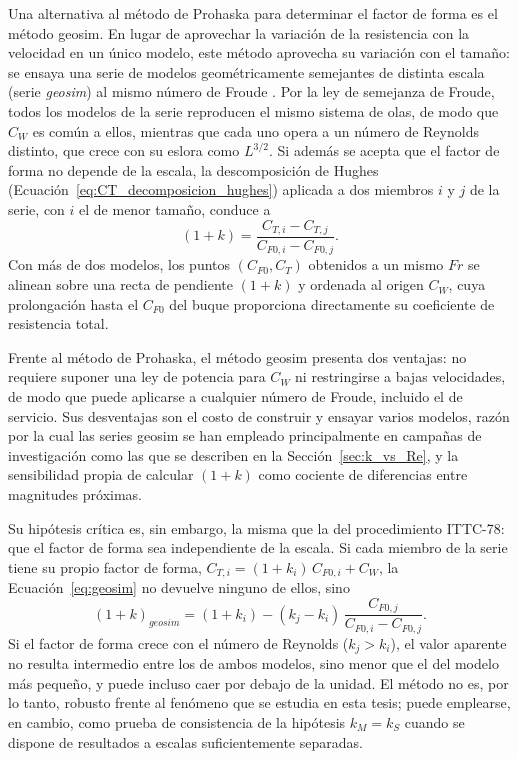 Una alternativa al método de Prohaska para determinar el factor de forma es el
método geosim. En lugar de aprovechar la variación de la resistencia con la
velocidad en un único modelo, este método aprovecha su variación con el tamaño:
se ensaya una serie de modelos geométricamente semejantes de distinta escala
(serie \emph{geosim}) al mismo número de Froude \citep{molland2017ship}. Por la
ley de semejanza de Froude, todos los modelos de la serie reproducen el mismo
sistema de olas, de modo que $C_W$ es común a ellos, mientras que cada uno opera a
un número de Reynolds distinto, que crece con su eslora como $L^{3/2}$. Si además
se acepta que el factor de forma no depende de la escala, la descomposición de
Hughes (Ecuación~\eqref{eq:CT_decomposicion_hughes}) aplicada a dos miembros
$i$ y $j$ de la serie, con $i$ el de menor tamaño, conduce a
%
\begin{equation}
    (1+k) = \frac{C_{T,i} - C_{T,j}}{C_{F0,i} - C_{F0,j}} .
    \label{eq:geosim}
\end{equation}
%
Con más de dos modelos, los puntos $(C_{F0}, C_T)$ obtenidos a un mismo $Fr$ se
alinean sobre una recta de pendiente $(1+k)$ y ordenada al origen $C_W$, cuya
prolongación hasta el $C_{F0}$ del buque proporciona directamente su coeficiente
de resistencia total.

Frente al método de Prohaska, el método geosim presenta dos ventajas: no
requiere suponer una ley de potencia para $C_W$ ni restringirse a bajas
velocidades, de modo que puede aplicarse a cualquier número de Froude, incluido
el de servicio. Sus desventajas son el costo de construir y ensayar varios
modelos, razón por la cual las series geosim se han empleado principalmente en
campañas de investigación como las que se describen en la
Sección~\ref{sec:k_vs_Re}, y la sensibilidad propia de calcular $(1+k)$ como
cociente de diferencias entre magnitudes próximas.

Su hipótesis crítica es, sin embargo, la misma que la del procedimiento ITTC-78:
que el factor de forma sea independiente de la escala. Si cada miembro de la
serie tiene su propio factor de forma, $C_{T,i} = (1+k_i)\,C_{F0,i} + C_W$, la
Ecuación~\eqref{eq:geosim} no devuelve ninguno de ellos, sino
%
\begin{equation}
    (1+k)_{geosim} = (1+k_i) - (k_j - k_i)\,
    \frac{C_{F0,j}}{C_{F0,i} - C_{F0,j}} .
    \label{eq:geosim_aparente}
\end{equation}
%
Si el factor de forma crece con el número de Reynolds ($k_j > k_i$), el valor
aparente no resulta intermedio entre los de ambos modelos, sino menor que el del
modelo más pequeño, y puede incluso caer por debajo de la unidad. El método no es,
por lo tanto, robusto frente al fenómeno que se estudia en esta tesis; puede
emplearse, en cambio, como prueba de consistencia de la hipótesis
$k_M = k_S$ cuando se dispone de resultados a escalas suficientemente separadas.

